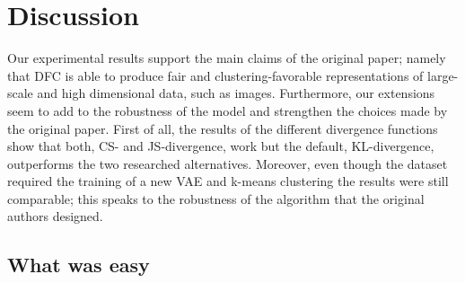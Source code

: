 


\section{Discussion}


Our experimental results support the main claims of the original paper; namely that DFC is able to produce fair and clustering-favorable representations of large-scale and high dimensional data, such as images. Furthermore, our extensions seem to add to the robustness of the model and strengthen the choices made by the original paper. First of all, the results of the different divergence functions show that both, CS- and JS-divergence, work but the default, KL-divergence, outperforms the two researched alternatives. Moreover, even though the \revMNIST dataset required the training of a new VAE and k-means clustering the results were still comparable; this speaks to the robustness of the algorithm that the original authors designed.

\subsection{What was easy}

